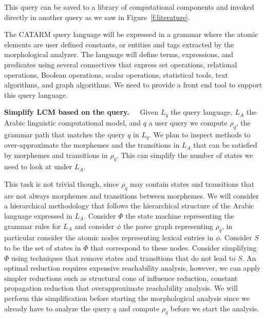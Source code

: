 \documentclass[12pt]{article}
\begin{document}
This query can be saved to a library of computational components
and invoked directly in another query 
as we saw in Figure~\ref{f:literature}.

\begin{figure}
\end{figure}

The CATARM query language will be expressed in a grammar 
where the atomic elements are user defined constants, or
entities and tags extracted by the morphological analyzer. 
The language will define terms, expressions, and predicates
using several connectives that express set operations, 
relational operations, Boolean operations, scalar operations, 
statistical tools, text algorithms, and graph algorithms. 
We need to provide a front end tool to support this query
language.

{\bf Simplify LCM based on the query.~~}
Given $L_q$ the query language, 
$L_A$ the Arabic linguistic
computational model, and  $q$ a user query
we compute $\rho_q$, the grammar path that matches 
the query $q$ in $L_q$. 
We plan to inspect methods to over-approximate 
the morphemes and the transitions in $L_A$ 
that can be satisfied by morphemes and transitions
in $\rho_q$. 
This can simplify the number of states we need to 
look at under $L_A$. 

This task is not trivial though, since $\rho_q$ may contain
states and transitions that are not always morphemes and 
transitions between morphemes. 
We will consider a hierarchical methodology that follows 
the hierarchical structure of the Arabic language expressed
in $L_A$. 
Consider $\Phi$ the state machine representing the grammar 
rules for $L_A$ and consider $\phi$ the parse graph 
representing $\rho_q$, in particular consider the atomic nodes 
representing lexical entries in $\phi$. 
Consider $S$ to be the set of states in $\Phi$ that 
correspond to these nodes. 
Consider simplifying $\Phi$ using techniques that remove 
states and transitions that do not lead to $S$. 
An optimal reduction requires expensive reachability 
analysis, however, we can apply simpler reductions such 
as structural cone of influence reduction,
constant propagation reduction that overapproximate
reachability analysis. 
We will perform this simplification before starting the 
morphological analysis since we already have to analyze
the query $q$ and compute $\rho_q$ before we start
the analysis. 
\end{document}
